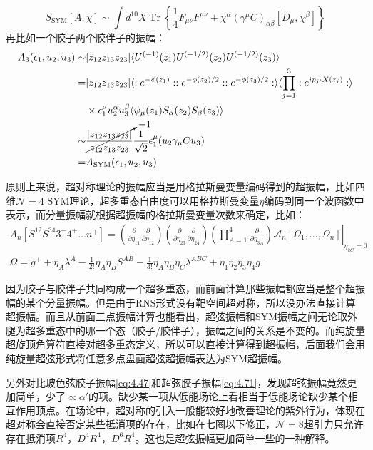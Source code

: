 \begin{equation}
	S_{\mathrm{SYM}}[A,\chi]\sim\int d^{10}X\operatorname{Tr}\left\{\frac{1}{4}F_{\mu\nu}F^{\mu\nu}+\chi^\alpha(\gamma^\mu C)_{\alpha\beta}[D_\mu,\chi^\beta]\right\}
\end{equation}
再比如一个胶子两个胶伴子的振幅：
\begin{equation}
	\begin{aligned}
		A_3(\epsilon_{1},u_{2},u_{3})\sim&|z_{12}z_{13}z_{23}|\langle U^{(-1)}(z_{1})U^{(-1/2)}(z_{2})U^{(-1/2)}(z_{3})\rangle\\
		=&|z_{12}z_{13}z_{23}|\langle:e^{-\phi(z_1)}::e^{-\phi(z_2)/2}::e^{-\phi(z_3)/2}:\rangle\langle\prod_{j=1}^3:e^{ip_j\cdot X(z_j)}:\rangle\\
		&\times\epsilon_1^\mu u_2^\alpha u_3^\beta\langle\psi_\mu(z_1)S_\alpha(z_2)S_\beta(z_3)\rangle\\
		\sim&\cancelto{-1}{\frac{|z_{12}z_{13}z_{23}|}{z_{12}z_{13}z_{23}}}\frac{1}{\sqrt{2}}\epsilon_1^\mu(u_2\gamma_\mu C u_3)\\
		=&A_{\text{SYM}}(\epsilon_1,u_2,u_3)
	\end{aligned}
\end{equation}

原则上来说，超对称理论的振幅应当是用格拉斯曼变量编码得到的超振幅，比如四维$\mathcal{N}=4$ SYM理论，超多重态自由度可以用格拉斯曼变量$\eta$编码到同一个波函数中表示，而分量振幅就根据超振幅的格拉斯曼变量次数来确定，比如：
\begin{equation}
\begin{gathered}
		A_n\left[S^{12}S^{34}3^-4^+\ldots n^+\right]=\left(\frac{\partial}{\partial\eta_{11}}\frac{\partial}{\partial\eta_{12}}\right)\left(\frac{\partial}{\partial\eta_{23}}\frac{\partial}{\partial\eta_{24}}\right)\left.\left(\prod_{A=1}^4\frac{\partial}{\partial\eta_{3A}}\right)\mathcal{A}_n[\Omega_1,\ldots,\Omega_n]\right|_{\eta_{kC}=0}\\
	\Omega=g^++\eta_A\lambda^A-\frac{1}{2!}\eta_A\eta_BS^{AB}-\frac{1}{3!}\eta_A\eta_B\eta_C\lambda^{ABC}+\eta_1\eta_2\eta_3\eta_4g^-
\end{gathered}
\end{equation}

因为胶子与胶伴子共同构成一个超多重态，而前面计算那些振幅都应当是整个超振幅的某个分量振幅。但是由于RNS形式没有靶空间超对称，所以没办法直接计算超振幅。而且从前面三点振幅计算也能看出，超弦振幅和SYM振幅之间无论取外腿为超多重态中的哪一个态（胶子/胶伴子），振幅之间的关系是不变的。而纯旋量超旋顶角算符直接对超多重态定义，所以可以直接计算得到超振幅，后面我们会用纯旋量超弦形式将任意多点盘面超弦超振幅表达为SYM超振幅。

另外对比玻色弦胶子振幅\ref{eq:4.47}和超弦胶子振幅\ref{eq:4.71}，发现超弦振幅竟然更加简单，少了$\propto\alpha'$的项。缺少某一项从低能场论上看相当于低能场论缺少某个相互作用顶点。在场论中，超对称的引入一般能较好地改善理论的紫外行为，体现在超对称会直接否定某些抵消项的存在，比如在七圈以下修正，$\mathcal{N}=8$超引力只允许存在抵消项$R^4$，$D^4R^4$，$D^6R^4$\cite{Elvang:2015rqa}。这也是超弦振幅更加简单一些的一种解释。
